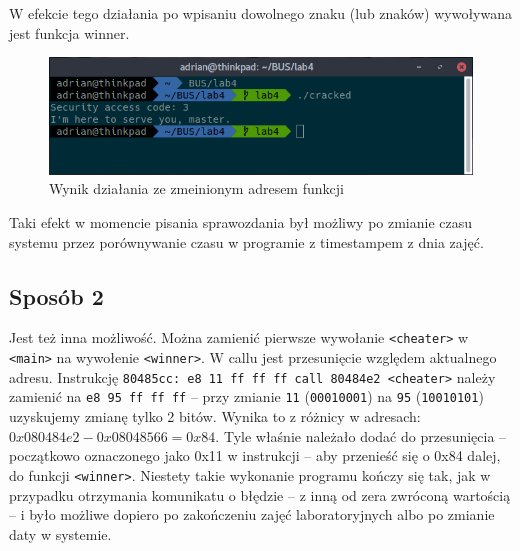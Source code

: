 \documentclass[a4paper]{article}
\begin{document}
	W efekcie tego działania po wpisaniu dowolnego znaku (lub znaków) wywoływana jest funkcja winner.
	
	\begin{figure}[H]
		\centering
		\includegraphics[width=.5\textwidth]{img/result}
		\caption{Wynik działania ze zmeinionym adresem funkcji}
	\end{figure}

	Taki efekt w momencie pisania sprawozdania był możliwy po zmianie czasu systemu przez porównywanie czasu w programie z timestampem z dnia zajęć.
	
	\subsection{Sposób 2}
		
	Jest też inna możliwość. Można zamienić pierwsze wywołanie \texttt{<cheater>} w \texttt{<main>} na wywołenie \texttt{<winner>}. W callu jest przesunięcie względem aktualnego adresu. Instrukcję
	\texttt{80485cc:	e8 11 ff ff ff       	call   80484e2 <cheater>}
	należy zamienić na \texttt{e8 95 ff ff ff} -- przy zmianie \texttt{11} (\texttt{00010001}) na \texttt{95} (\texttt{10010101}) uzyskujemy zmianę tylko 2 bitów. Wynika to z różnicy w adresach: $0x080484e2 - 0x08048566 = 0x84$.
	Tyle właśnie należało dodać do przesunięcia -- początkowo oznaczonego jako 0x11 w instrukcji -- aby przenieść się o 0x84 dalej, do funkcji \texttt{<winner>}.
	Niestety takie wykonanie programu kończy się tak, jak w przypadku otrzymania komunikatu o błędzie -- z inną od zera zwróconą wartością -- i było możliwe dopiero po zakończeniu zajęć laboratoryjnych albo po zmianie daty w systemie.
	
\end{document}
